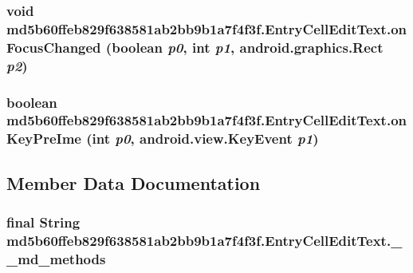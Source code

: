 \hypertarget{classmd5b60ffeb829f638581ab2bb9b1a7f4f3f_1_1_entry_cell_edit_text_e96ee8d425aa2330f0e03f3e2e42aa1e}{
\subsubsection[{onFocusChanged}]{\setlength{\rightskip}{0pt plus 5cm}void md5b60ffeb829f638581ab2bb9b1a7f4f3f.EntryCellEditText.onFocusChanged (boolean {\em p0}, \/  int {\em p1}, \/  android.graphics.Rect {\em p2})}}
\label{classmd5b60ffeb829f638581ab2bb9b1a7f4f3f_1_1_entry_cell_edit_text_e96ee8d425aa2330f0e03f3e2e42aa1e}


\hypertarget{classmd5b60ffeb829f638581ab2bb9b1a7f4f3f_1_1_entry_cell_edit_text_e1f0f5abfb6ec318b45c3b0e65655095}{
\subsubsection[{onKeyPreIme}]{\setlength{\rightskip}{0pt plus 5cm}boolean md5b60ffeb829f638581ab2bb9b1a7f4f3f.EntryCellEditText.onKeyPreIme (int {\em p0}, \/  android.view.KeyEvent {\em p1})}}
\label{classmd5b60ffeb829f638581ab2bb9b1a7f4f3f_1_1_entry_cell_edit_text_e1f0f5abfb6ec318b45c3b0e65655095}




\subsection{Member Data Documentation}
\hypertarget{classmd5b60ffeb829f638581ab2bb9b1a7f4f3f_1_1_entry_cell_edit_text_12054a03c17af4ab15a7d12108ce682a}{
\subsubsection[{\_\-\_\-md\_\-methods}]{\setlength{\rightskip}{0pt plus 5cm}final String {\bf md5b60ffeb829f638581ab2bb9b1a7f4f3f.EntryCellEditText.\_\-\_\-md\_\-methods}}}
\label{classmd5b60ffeb829f638581ab2bb9b1a7f4f3f_1_1_entry_cell_edit_text_12054a03c17af4ab15a7d12108ce682a}


